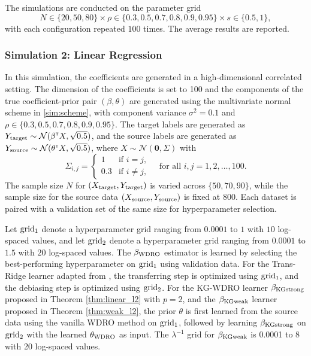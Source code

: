 \documentclass[12pt]{article}
\begin{document}
The simulations are conducted on the parameter grid $$N \in \{20, 50, 80\} \times \rho \in \{0.3, 0.5, 0.7, 0.8, 0.9, 0.95\} \times s \in \{0.5, 1\},$$ with each configuration repeated $100$ times. The average results are reported.

\subsubsection{Simulation 2: Linear Regression}
In this simulation, the coefficients are generated in a high-dimensional correlated setting. The dimension of the coefficients is set to 100 and the components of the true coefficient-prior pair $(\beta, \theta)$ are generated using the multivariate normal scheme in \eqref{sim:scheme}, with component variance $\sigma^2 = 0.1$ and $\rho \in \{0.3, 0.5, 0.7, 0.8, 0.9, 0.95\}$. The target labels are generated as $Y_{\rm target} \sim \mathcal{N}(\beta^{\scriptscriptstyle \sf T} X , \sqrt{0.5})$, and the source labels are generated as $Y_{\rm source} \sim  \mathcal{N}(\theta^{\scriptscriptstyle \sf T} X , \sqrt{0.5})$, where $X\sim \mathcal{N}(\mathbf{0}, \Sigma)$ with \[
\Sigma_{i,j} = 
\begin{cases}
1 & \text{if } i = j, \\
0.3 & \text{if } i \neq j,
\end{cases}
\quad \text{for all } i, j = 1, 2, \dots, 100.
\] The sample size $N$ for $(X_{\rm target}, Y_{\rm target})$ is varied across $\{50, 70, 90\}$, while the sample size for the source data $(X_{\rm source}, Y_{\rm source})$ is fixed at 800. Each dataset is paired with a validation set of the same size for hyperparameter selection.

Let $\rm grid_1$ denote a hyperparameter grid ranging from $0.0001$ to $1$ with $10$ log-spaced values, and let $\rm grid_2$ denote a hyperparameter grid ranging from $0.0001$ to $1.5$ with $20$ log-spaced values. The $\beta_{\rm WDRO}$ estimator is learned by selecting the best-performing hyperparameter on $\rm grid_1$ using validation data. For the Trans-Ridge learner adapted from \citep[Algorithm 1]{li2021translasso}, the transferring step is optimized using $\rm grid_1$, and the debiasing step is optimized using $\rm grid_2$. For the KG-WDRO learner $\beta_{\rm KGstrong}$ proposed in Theorem \ref{thm:linear_l2} with $p=2$, and the $\beta_{\rm KGweak}$ learner proposed in Theorem \ref{thm:weak_l2}, the prior $\theta$ is first learned from the source data using the vanilla WDRO method on $\rm grid_1$, followed by learning $\beta_{\rm KGstrong}$ on $\rm grid_2$ with the learned $\theta_{\rm WDRO}$ as input. The $\lambda^{-1}$ grid for $\beta_{\rm KGweak}$ is 0.0001 to 8 with 20 log-spaced values.
\end{document}
